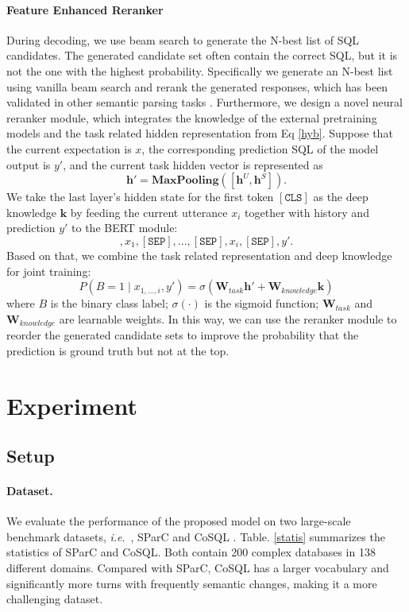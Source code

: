 \documentclass[letterpaper]{article} \usepackage{aaai21}  \usepackage{times}  \usepackage{helvet} \usepackage{courier}  \usepackage[hyphens]{url}  \usepackage{graphicx} \urlstyle{rm} \def\UrlFont{\rm}  \usepackage{natbib}  \usepackage{caption} \frenchspacing  \setlength{\pdfpagewidth}{8.5in}  \setlength{\pdfpageheight}{11in}
\def\ie{\emph{i.e}.~}
\begin{document}
\paragraph{Feature Enhanced Reranker} 
During decoding, we use beam search to generate the N-best list of SQL candidates.
The generated candidate set often contain the correct SQL, but it is not the one with the highest probability.
Specifically we generate an N-best list using vanilla beam search and rerank the generated responses, which has been validated in other semantic parsing tasks \cite{yin-neubig-2019-reranking}.
Furthermore, we design a novel neural reranker module, which integrates the knowledge of the external pretraining models and the task related hidden representation from Eq \ref{hyb}.
Suppose that the current expectation is $x$, the corresponding prediction SQL of the model output is $y'$, and the current task hidden vector is represented as 
\begin{equation}
\mathbf{h}' = \mathbf{MaxPooling}([\mathbf{h}^U, \mathbf{h}^S]). 
\end{equation}
We take the last layer’s hidden state for the first token $[\texttt{CLS}]$ as the deep knowledge $\mathbf{k}$ by feeding the current utterance $x_i$ together with history and prediction $y'$ to the BERT module:
\begin{equation}
[\texttt{CLS}], x_1, [\texttt{SEP}], ..., [\texttt{SEP}], x_i, [\texttt{SEP}], y'.
\end{equation}
Based on that, we combine the task related representation and deep knowledge for joint training:
\begin{equation}
P(B=1 \mid x_{1, ..., i}, y')=\sigma\left(\mathbf{W}_{task}\mathbf{h'}+\mathbf{W}_{knowledge} \mathbf{k}\right)
\end{equation}
where $B$ is the binary class label; $\sigma(\cdot)$ is the sigmoid function; $\mathbf{W}_{task}$ and $\mathbf{W}_{knowledge}$ are learnable weights.
In this way, we can use the reranker module to reorder the generated candidate sets to improve the probability that the prediction is ground truth but not at the top.


\section{Experiment}

\subsection{Setup}
\paragraph{Dataset.} 
We evaluate the performance of the proposed model on two large-scale benchmark datasets, \ie, SParC \cite{DBLP:conf/acl/YuZYTLLELPCJDPS19} and CoSQL \cite{DBLP:conf/emnlp/YuZELXPLTSLJYSC19}.
Table. \ref{statis} summarizes the statistics of SParC and CoSQL. 
Both contain 200 complex databases in 138 different domains.
Compared with SParC, CoSQL has a larger vocabulary and significantly more turns with frequently semantic changes, making it a more challenging dataset.
\end{document}
